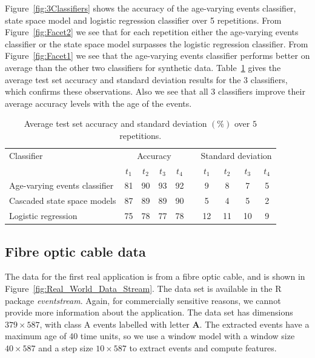 \documentclass[a4paper,11pt]{article}
\begin{document}
Figure~\ref{fig:3Classifiers} shows the accuracy of the age-varying events classifier, state space model and logistic regression classifier over 5 repetitions.  From Figure~\ref{fig:Facet2} we see that for each repetition either the age-varying events classifier or the state space model surpasses the logistic regression classifier. From Figure~\ref{fig:Facet1} we see that the age-varying events classifier performs better on average than the other two classifiers for synthetic data. Table~\ref{tab:Results_Synthetic} gives the average test set accuracy and standard deviation results for the 3 classifiers, which confirms these observations. Also we see that all 3 classifiers improve their average accuracy levels with the age of the events.

\begin{table}[!ht]
  \centering
  \begin{tabular}{lccccccccc}
    \toprule
    Classifier                   & \multicolumn{4}{c}{Accuracy} & & \multicolumn{4}{c}{Standard deviation} \\
    \cmidrule{2-5} \cmidrule{7-10}
                                 & $t_1$ & $t_2$ & $t_3$ & $t_4$   & & $t_1$ & $t_2$ & $t_3$ & $t_4$\\
    \midrule
    Age-varying events classifier & 81    & 90    & 93    & 92  &  & 9  & 8  &  7  & 5 \\
    Cascaded state space models  & 87    & 89    & 89    & 90   & & 5  & 4  &  5  & 2\\
    Logistic regression          & 75    & 78    & 77    & 78   & & 12  & 11 & 10 & 9 \\
    \bottomrule
  \end{tabular}
    \caption{Average test set accuracy and standard deviation $(\%)$ over $5$ repetitions.}\label{tab:Results_Synthetic}
\end{table}

\subsection{Fibre optic cable data}

The data for the first real application is from a fibre optic cable, and is shown in Figure~\ref{fig:Real_World_Data_Stream}.  The data set is available in the R package \textit{eventstream}. Again, for commercially sensitive reasons, we cannot provide more information about the application. The data set has dimensions $379 \times 587$, with class A events labelled with letter \textbf{A}. The extracted events have a maximum age of 40 time units, so we use a window model with a window size $40 \times 587$ and a step size $10 \times 587$ to extract events and compute features.
\end{document}
